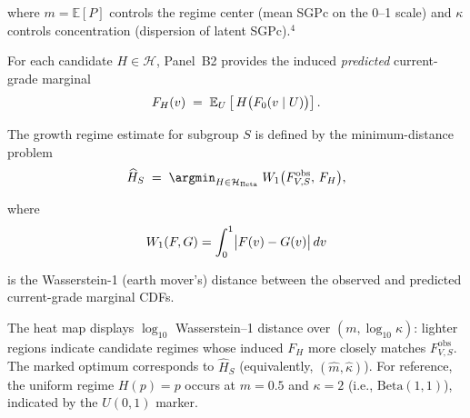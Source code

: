 \documentclass[10pt]{article}
\begin{document}
\begin{minipage}[t]{7.65in}
\begin{minipage}{7.35in}
    \vspace{1pt}
    where $m=\mathbb{E}[P]$ controls the regime center (mean SGPc on the 0--1 scale) and
    $\kappa$ controls concentration (dispersion of latent SGPc).$^\mbox{4}$
    
    \vspace{4pt}
    For each candidate $H\in\mathcal{H}$, Panel~B2 provides the 
    induced \emph{predicted} current-grade marginal
    \[
      F_{H}(v)\;=\;\mathbb{E}_{U}\left[\,H\bigl(F_0(v\mid U)\bigr)\right].
    \]

    \vspace{4pt}
    The growth regime estimate for subgroup $S$ is defined by the minimum-distance problem
    \[
      \widehat{H}_S \;=\;
      \argmin_{H\in\mathcal{H}_{\mathrm{Beta}}}\;
      \Wone\bigl(F^{\mathrm{obs}}_{V,S},\,F_{H}\bigr),
    \]

    \vspace{1pt}
    where
    \[
      W_1(F,G)=\int_0^1 \bigl|F(v)-G(v)\bigr|\,dv
    \]

    \vspace{1pt}
    is the Wasserstein-1 (earth mover's) distance between the observed and predicted current-grade marginal CDFs.
    
    \vspace{4pt}
    The heat map displays $\log_{10}$ Wasserstein--1 distance over $(m,\log_{10}\kappa)$: lighter 
    regions indicate candidate regimes whose induced $F_H$ more closely matches $F^{\mathrm{obs}}_{V,S}$.
    The marked optimum corresponds to $\widehat{H}_S$ (equivalently, $(\hat m,\hat\kappa)$).
    For reference, the uniform regime $H(p)=p$ occurs at $m=0.5$ and $\kappa=2$ (i.e., $\mathrm{Beta}(1,1)$),
    indicated by the $U(0,1)$ marker.

  \end{minipage}
  \vspace{0.1in}
\end{minipage}
\end{document}
